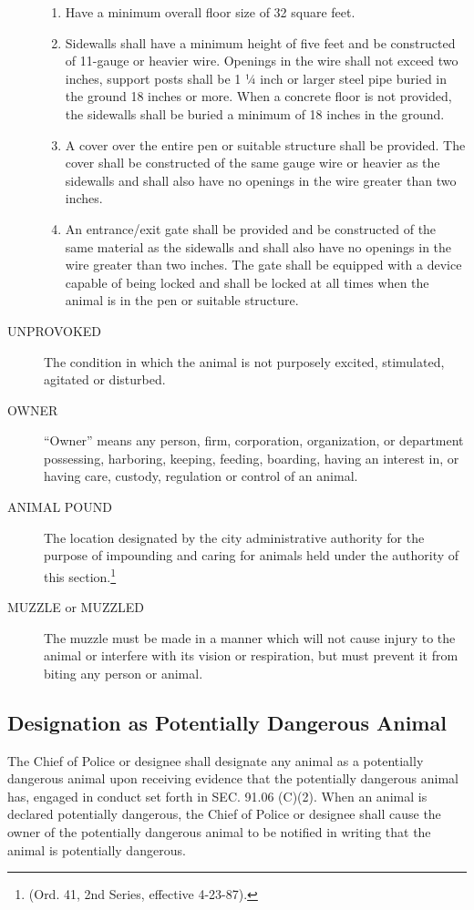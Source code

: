 \begin{description}
\begin{enumerate}
        \item Have a minimum overall floor size of 32 square feet.
        \item Sidewalls shall have a minimum height of five feet and be constructed of 11-gauge or heavier wire.  Openings in the wire shall not exceed two inches, support posts shall be 1 ¼ inch or larger steel pipe buried in the ground 18 inches or more.  When a concrete floor is not provided, the sidewalls shall be buried a minimum of 18 inches in the ground.
        \item A cover over the entire pen or suitable structure shall be provided.  The cover shall be constructed of the same gauge wire or heavier as the sidewalls and shall also have no openings in the wire greater than two inches.
        \item An entrance/exit gate shall be provided and be constructed of the same material as the sidewalls and shall also have no openings in the wire greater than two inches.  The gate shall be equipped with a device capable of being locked and shall be locked at all times when the animal is in the pen or suitable structure.
    \end{enumerate}
    \item[UNPROVOKED] The condition in which the animal is not purposely excited, stimulated, agitated or disturbed.
    \item[OWNER] “Owner” means any person, firm, corporation, organization, or department possessing, harboring, keeping, feeding, boarding, having an interest in, or having care, custody, regulation or control of an animal.
    \item[ANIMAL POUND] The location designated by the city administrative authority for the purpose of impounding and caring for animals held under the authority of this section.\footnote{(Ord. 41, 2nd Series, effective 4-23-87).}
    \item[MUZZLE or MUZZLED] The muzzle must be made in a manner which will not cause injury to the animal or interfere with its vision or respiration, but must prevent it from biting any person or animal.
\end{description}
\subsection{Designation as Potentially Dangerous Animal}
The Chief of Police or designee shall designate any animal as a potentially dangerous animal upon receiving evidence that the potentially dangerous animal has, engaged in conduct set forth in SEC. 91.06 (C)(2).  When an animal is declared potentially dangerous, the Chief of Police or designee shall cause the owner of the potentially dangerous animal to be notified in writing that the animal is potentially dangerous.
